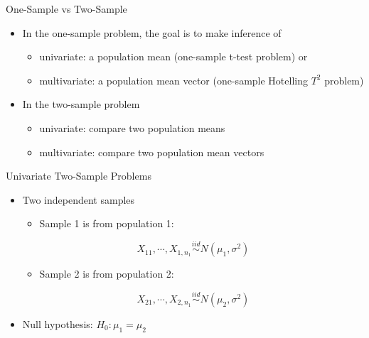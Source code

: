 \documentclass[
  ignorenonframetext,
]{beamer}
\providecommand{\tightlist}{%
  \setlength{\itemsep}{0pt}\setlength{\parskip}{0pt}}
\begin{document}
\begin{frame}{One-Sample vs Two-Sample}
\protect\hypertarget{one-sample-vs-two-sample}{}
\begin{itemize}
\tightlist
\item
  In the one-sample problem, the goal is to make inference of

  \begin{itemize}
  \tightlist
  \item
    univariate: a population mean (one-sample t-test problem) or
  \item
    multivariate: a population mean vector (one-sample Hotelling \(T^2\)
    problem)
  \end{itemize}
\item
  In the two-sample problem

  \begin{itemize}
  \tightlist
  \item
    univariate: compare two population means
  \item
    multivariate: compare two population mean vectors
  \end{itemize}
\end{itemize}
\end{frame}

\begin{frame}{Univariate Two-Sample Problems}
\protect\hypertarget{univariate-two-sample-problems}{}
\begin{itemize}
\tightlist
\item
  Two independent samples

  \begin{itemize}
  \tightlist
  \item
    Sample 1 is from population 1:
  \end{itemize}

  \[X_{11}, \cdots, X_{1,n_1}\overset{iid} \sim N(\mu_1,\sigma^2)\]

  \begin{itemize}
  \tightlist
  \item
    Sample 2 is from population 2:
  \end{itemize}

  \[X_{21}, \cdots, X_{2,n_1}\overset{iid} \sim N(\mu_2,\sigma^2)\]
\item
  Null hypothesis: \(H_0: \mu_1=\mu_2\)
\end{itemize}
\end{frame}
\end{document}
